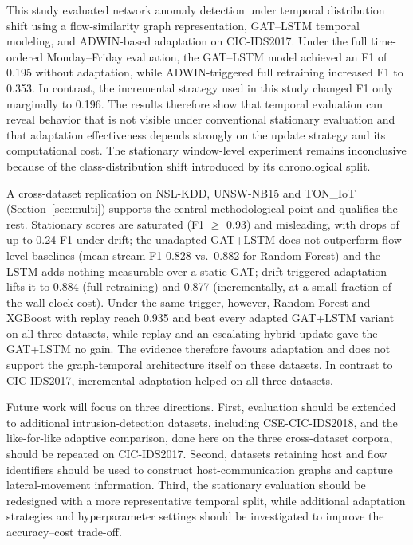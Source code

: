 \documentclass[twocolumn]{llncs}
\begin{document}
This study evaluated network anomaly detection under temporal distribution shift using a flow-similarity graph representation, GAT--LSTM temporal modeling, and ADWIN-based adaptation on CIC-IDS2017. Under the full time-ordered Monday--Friday evaluation, the GAT--LSTM model achieved an F1 of 0.195 without adaptation, while ADWIN-triggered full retraining increased F1 to 0.353. In contrast, the incremental strategy used in this study changed F1 only marginally to 0.196. The results therefore show that temporal evaluation can reveal behavior that is not visible under conventional stationary evaluation and that adaptation effectiveness depends strongly on the update strategy and its computational cost. The stationary window-level experiment remains inconclusive because of the class-distribution shift introduced by its chronological split.

A cross-dataset replication on NSL-KDD, UNSW-NB15 and TON\_IoT (Section~\ref{sec:multi}) supports the central methodological point and qualifies the rest. Stationary scores are saturated (F1 $\ge$ 0.93) and misleading, with drops of up to 0.24 F1 under drift; the unadapted GAT+LSTM does not outperform flow-level baselines (mean stream F1 0.828 vs.\ 0.882 for Random Forest) and the LSTM adds nothing measurable over a static GAT; drift-triggered adaptation lifts it to 0.884 (full retraining) and 0.877 (incrementally, at a small fraction of the wall-clock cost). Under the same trigger, however, Random Forest and XGBoost with replay reach 0.935 and beat every adapted GAT+LSTM variant on all three datasets, while replay and an escalating hybrid update gave the GAT+LSTM no gain. The evidence therefore favours adaptation and does not support the graph-temporal architecture itself on these datasets. In contrast to CIC-IDS2017, incremental adaptation helped on all three datasets.

Future work will focus on three directions. First, evaluation should be extended to additional intrusion-detection datasets, including CSE-CIC-IDS2018, and the like-for-like adaptive comparison, done here on the three cross-dataset corpora, should be repeated on CIC-IDS2017. Second, datasets retaining host and flow identifiers should be used to construct host-communication graphs and capture lateral-movement information. Third, the stationary evaluation should be redesigned with a more representative temporal split, while additional adaptation strategies and hyperparameter settings should be investigated to improve the accuracy--cost trade-off.
\end{document}
